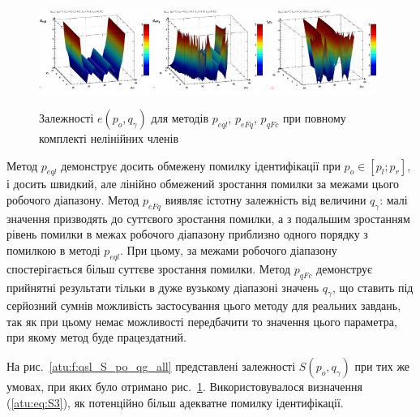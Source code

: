 \documentclass[a4paper,13pt]{atuaref}
\begin{document}
\begin{figure}[htb!]
  \centerline{
    \includegraphics[width=0.32\textwidth]{p3/p/qls_pe-p_po_qg_eql_all.png}
    \hfill
    \includegraphics[width=0.32\textwidth]{p3/p/qls_pe-p_po_qg_eFq_all.png}
    \hfill
    \includegraphics[width=0.32\textwidth]{p3/p/qls_pe-p_po_qg_eFc_all.png}
  }
  \caption{Залежності $e(p_o,q_\gamma)$ для методів $p_{eql}$, $p_{eFq}$, $p_{qFc}$ при повному комплекті нелінійних членів}
  \label{atu:f:qsl_pe_po_qg_all}
\end{figure}

Метод $ p_ {eql} $ демонструє досить обмежену помилку ідентифікації при
$ p_o \in [p_l; p_r] $, і досить швидкий, але лінійно обмежений зростання помилки за
межами цього робочого діапазону. Метод $ p_{eFq} $ виявляє істотну залежність
від величини $ q_\gamma $: малі значення призводять до суттєвого
зростання помилки, а з подальшим зростанням рівень помилки в межах робочого
діапазону приблизно одного порядку з помилкою в методі $ p_{eql} $. При
цьому, за межами робочого діапазону спостерігається більш суттєве зростання
помилки. Метод $ p_ {qFc} $ демонструє прийнятні результати тільки в дуже
вузькому діапазоні значень $ q_\gamma $, що ставить під серйозний сумнів
можливість застосування цього методу для реальних завдань, так як при цьому
немає можливості передбачити то значення цього параметра, при якому метод буде
працездатний.

На рис.~\ref{atu:f:qsl_S_po_qg_all} представлені залежності
$ S (p_o, q_\gamma) $
при тих же умовах, при яких було отримано рис.~\ref{atu:f:qsl_pe_po_qg_all}.
Використовувалося визначення (\ref{atu:eq:S3}), як
потенційно більш адекватне помилку ідентифікації.
\end{document}
